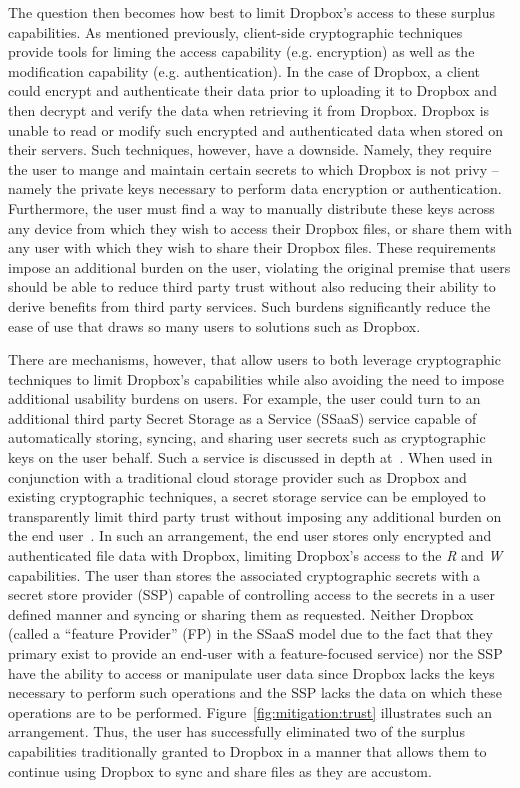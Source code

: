 The question then becomes how best to limit Dropbox's access to these
surplus capabilities. As mentioned previously, client-side
cryptographic techniques provide tools for liming the access
capability (e.g. encryption) as well as the modification capability
(e.g. authentication). In the case of Dropbox, a client could encrypt
and authenticate their data prior to uploading it to Dropbox and then
decrypt and verify the data when retrieving it from Dropbox. Dropbox
is unable to read or modify such encrypted and authenticated data when
stored on their servers. Such techniques, however, have a
downside. Namely, they require the user to mange and maintain certain
secrets to which Dropbox is not privy -- namely the private keys
necessary to perform data encryption or authentication. Furthermore,
the user must find a way to manually distribute these keys across any
device from which they wish to access their Dropbox files, or share
them with any user with which they wish to share their Dropbox
files. These requirements impose an additional burden on the user,
violating the original premise that users should be able to reduce
third party trust without also reducing their ability to derive
benefits from third party services. Such burdens significantly reduce
the ease of use that draws so many users to solutions such as Dropbox.

There are mechanisms, however, that allow users to both leverage
cryptographic techniques to limit Dropbox's capabilities while also
avoiding the need to impose additional usability burdens on users. For
example, the user could turn to an additional third party Secret
Storage as a Service (SSaaS) service capable of automatically storing,
syncing, and sharing user secrets such as cryptographic keys on the
user behalf. Such a service is discussed in depth
at~\cite{custos-trios}. When used in conjunction with a traditional
cloud storage provider such as Dropbox and existing cryptographic
techniques, a secret storage service can be employed to transparently
limit third party trust without imposing any additional burden on the
end user~\cite{sayler-phd}. In such an arrangement, the end user
stores only encrypted and authenticated file data with Dropbox,
limiting Dropbox's access to the \emph{R} and \emph{W}
capabilities. The user than stores the associated cryptographic
secrets with a secret store provider (SSP) capable of controlling
access to the secrets in a user defined manner and syncing or sharing
them as requested. Neither Dropbox (called a ``feature Provider'' (FP)
in the SSaaS model due to the fact that they primary exist to provide
an end-user with a feature-focused service) nor the SSP have the
ability to access or manipulate user data since Dropbox lacks the keys
necessary to perform such operations and the SSP lacks the data on
which these operations are to be performed.
Figure~\ref{fig:mitigation:trust} illustrates such an
arrangement. Thus, the user has successfully eliminated two of the
surplus capabilities traditionally granted to Dropbox in a manner that
allows them to continue using Dropbox to sync and share files as they
are accustom.

